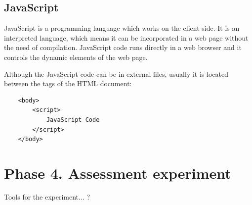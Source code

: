 \subsection{JavaScript}
\label{subsec:javascript}

JavaScript is a programming language which works on the client side. It is an interpreted language, which means it can be incorporated in a web page without the need of compilation. JavaScript code runs directly in a web browser and it controls the dynamic elements of the web page. 

Although the JavaScript code can be in external files, usually it is located between the tags of the HTML document:
{\footnotesize
\begin{verbatim}
    <body>
        <script>
            JavaScript Code
        </script>        
    </body>
\end{verbatim}
}



\section{Phase 4. Assessment experiment}
\label{sec:phase_4}

Tools for the experiment... ?

